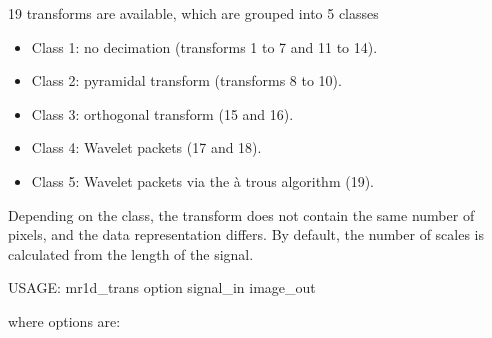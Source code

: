 19 transforms are available, which are grouped into 5 classes 
\begin{itemize}
\item{Class 1:} no decimation (transforms 1 to 7 and 11 to 14).
\item{Class 2:} pyramidal transform (transforms 8 to 10).
\item{Class 3:} orthogonal transform (15 and 16).
\item{Class 4:} Wavelet packets (17 and 18).
\item{Class 5:} Wavelet packets via the \`a trous algorithm  (19).
\end{itemize}
Depending on the class, the transform does not contain the
same number of pixels, and the data representation differs.
By default, the number of scales is calculated from
the length of the signal.
{\bf
\begin{center}
 USAGE: mr1d\_trans option signal\_in image\_out
\end{center}}
where options are:
